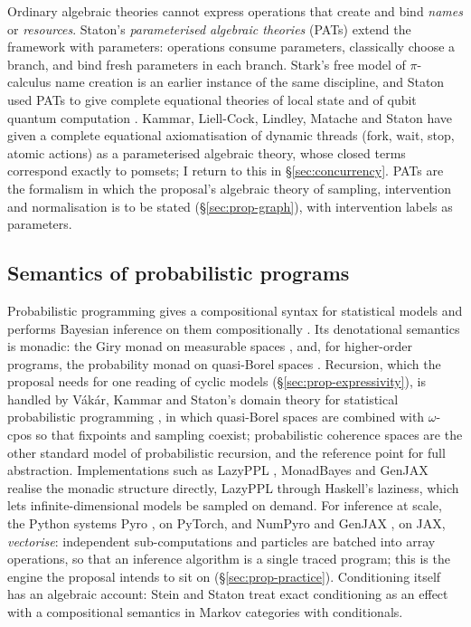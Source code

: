 Ordinary algebraic theories cannot express operations that create and bind \emph{names} or \emph{resources}. Staton's \emph{parameterised algebraic theories} (PATs) \cite{statonlics13,statonpopl15} extend the framework with parameters: operations consume parameters, classically choose a branch, and bind fresh parameters in each branch. Stark's free model of $\pi$-calculus name creation \cite{stark:freamp} is an earlier instance of the same discipline, and Staton used PATs to give complete equational theories of local state \cite{statonlics13} and of qubit quantum computation \cite{statonpopl15}. Kammar, Liell-Cock, Lindley, Matache and Staton \cite{kammar2026threads} have given a complete equational axiomatisation of dynamic threads (fork, wait, stop, atomic actions) as a parameterised algebraic theory, whose closed terms correspond exactly to pomsets; I return to this in \S\ref{sec:concurrency}. PATs are the formalism in which the proposal's algebraic theory of sampling, intervention and normalisation is to be stated (\S\ref{sec:prop-graph}), with intervention labels as parameters.

\subsection{Semantics of probabilistic programs}

Probabilistic programming gives a compositional syntax for statistical models and performs Bayesian inference on them compositionally \cite{vandemeent2021introductionprobabilisticprogramming}. Its denotational semantics is monadic: the Giry monad on measurable spaces \cite{kock72,semantics_ppl_staton2016}, and, for higher-order programs, the probability monad on quasi-Borel spaces \cite{Heunen_2017}. Recursion, which the proposal needs for one reading of cyclic models (\S\ref{sec:prop-expressivity}), is handled by Vákár, Kammar and Staton's domain theory for statistical probabilistic programming \cite{vakar2019domain}, in which quasi-Borel spaces are combined with $\omega$-cpos so that fixpoints and sampling coexist; probabilistic coherence spaces \cite{ehrhard2014pcoh} are the other standard model of probabilistic recursion, and the reference point for full abstraction. Implementations such as LazyPPL \cite{lazyppl}, MonadBayes \cite{monadbayes1,monadbayes2} and GenJAX \cite{becker26genjax} realise the monadic structure directly, LazyPPL through Haskell's laziness, which lets infinite-dimensional models be sampled on demand. For inference at scale, the Python systems Pyro \cite{bingham2018pyro}, on PyTorch, and NumPyro \cite{phan2019composable} and GenJAX \cite{becker26genjax}, on JAX, \emph{vectorise}: independent sub-computations and particles are batched into array operations, so that an inference algorithm is a single traced program; this is the engine the proposal intends to sit on (\S\ref{sec:prop-practice}). Conditioning itself has an algebraic account: Stein and Staton \cite{stein2021exact} treat exact conditioning as an effect with a compositional semantics in Markov categories with conditionals.

